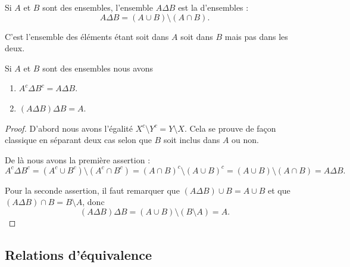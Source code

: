 \begin{definition}    \label{DefBMLooVjlSG}
    Si \( A\) et \( B\) sont des ensembles, l'ensemble \( A\Delta B\) est la  d'ensembles :
    \begin{equation}
        A\Delta B=(A\cup B)\setminus(A\cap B).
    \end{equation}
\end{definition}
C'est l'ensemble des éléments étant soit dans \( A\) soit dans \( B\) mais pas dans les deux.

\begin{lemma}   \label{LemCUVoohKpWB}
    Si \( A\) et \( B\) sont des ensembles nous avons
    \begin{enumerate}
        \item\label{ItemVUCooHAztC}
            \( A^c\Delta B^c=A\Delta B\).
        \item\label{ItemVUCooHAztCii}
            \( (A\Delta B)\Delta B=A\).
    \end{enumerate}
\end{lemma}

\begin{proof}
    D'abord nous avons l'égalité \( X^c\setminus Y^c=Y\setminus X\). Cela se prouve de façon classique en séparant deux cas selon que \( B\) soit inclus dans \( A\) ou non.

    De là nous avons la première assertion :
    \begin{equation}
        A^c\Delta B^c=(A^c\cup B^c)\setminus(A^c\cap B^c)=(A\cap B)^c\setminus(A\cup B)^c=(A\cup B)\setminus (A\cap B)=A\Delta B.
    \end{equation}

    Pour la seconde assertion, il faut remarquer que \( (A\Delta B)\cup B=A\cup B\) et que \( (A\Delta B)\cap B=B\setminus A\), donc
    \begin{equation}
        (A\Delta B)\Delta B=(A\cup B)\setminus (B\setminus A)=A.
    \end{equation}
\end{proof}

\subsection{Relations d'équivalence}
\label{appEquivalence}

